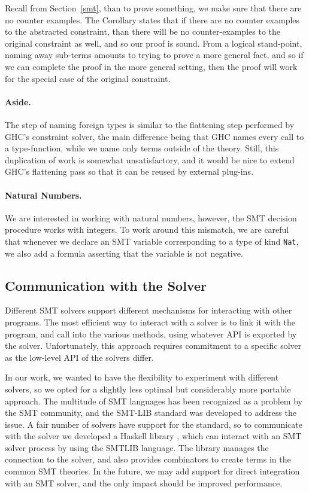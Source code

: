 \documentclass{sigplanconf}
\begin{document}
Recall from Section~\ref{smt}, than to prove something, we make sure
that there are no counter examples.  The Corollary states that if there
are no counter examples to the abstracted constraint, than there will
be no counter-examples to the original constraint as well, and so our
proof is sound.  From a logical stand-point, naming away sub-terms
amounts to trying to prove a more general fact, and so if we can complete
the proof in the more general setting, then the proof will work for
the special case of the original constraint.

\paragraph{Aside.}
The step of naming foreign types is similar to the flattening step performed
by GHC's constraint solver, the main difference being that GHC names every
call to a type-function, while we name only terms outside of the theory.
Still, this duplication of work is somewhat unsatisfactory, and it would
be nice to extend GHC's flattening pass so that it can be reused by
external plug-ins.

\paragraph{Natural Numbers.}
We are interested in working with natural numbers, however, the SMT
decision procedure works with integers.  To work around this mismatch,
we are careful that whenever we declare an SMT variable corresponding
to a type of kind \Verb"Nat", we also add a formula asserting that
the variable is not negative.



\subsection{Communication with the Solver}

Different SMT solvers support different mechanisms for interacting
with other programs.  The most efficient way to interact with a solver
is to link it with the program, and call into the various methods,
using whatever API is exported by the solver.  Unfortunately, this
approach requires commitment to a specific solver as the low-level
API of the solvers differ.

In our work, we wanted to have the flexibility to experiment with
different solvers, so we opted for a slightly less optimal but
considerably more portable approach.  The multitude of SMT languages
has been recognized as a problem by the SMT community, and the
SMT-LIB standard \cite{smtlib2} was developed to address the issue.
A fair number of solvers have support for the standard, so
to communicate with the solver we developed a Haskell library
\cite{simple-smt}, which can interact with an SMT solver process
by using the SMTLIB language.  The library manages the connection
to the solver, and also provides combinators to create terms
in the common SMT theories.  In the future, we may add support for
direct integration with an SMT solver, and the only impact
should be improved performance.
\end{document}
